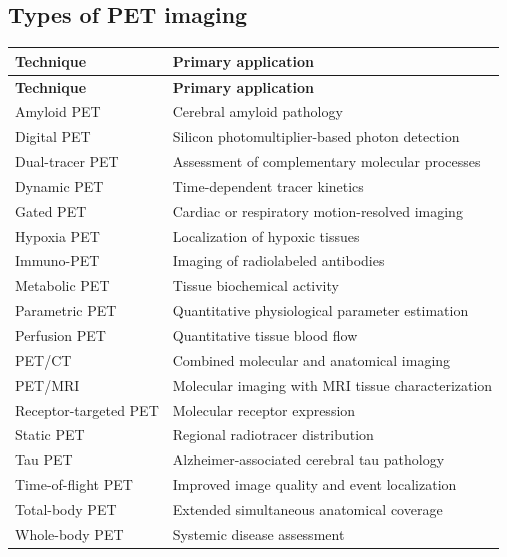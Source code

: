 \subsection{Types of PET imaging}
\begin{longtable}{@{}p{}p{}@{}}
\toprule
\textbf{Technique} & \textbf{Primary application} \\
\midrule
\endfirsthead
\toprule
\textbf{Technique} & \textbf{Primary application} \\
\midrule
\endhead
Amyloid PET & Cerebral amyloid pathology \\
Digital PET & Silicon photomultiplier-based photon detection \\
Dual-tracer PET & Assessment of complementary molecular processes \\
Dynamic PET & Time-dependent tracer kinetics \\
Gated PET & Cardiac or respiratory motion-resolved imaging \\
Hypoxia PET & Localization of hypoxic tissues \\
Immuno-PET & Imaging of radiolabeled antibodies \\
Metabolic PET & Tissue biochemical activity \\
Parametric PET & Quantitative physiological parameter estimation \\
Perfusion PET & Quantitative tissue blood flow \\
PET/CT & Combined molecular and anatomical imaging \\
PET/MRI & Molecular imaging with MRI tissue characterization \\
Receptor-targeted PET & Molecular receptor expression \\
Static PET & Regional radiotracer distribution \\
Tau PET & Alzheimer-associated cerebral tau pathology \\
Time-of-flight PET & Improved image quality and event localization \\
Total-body PET & Extended simultaneous anatomical coverage \\
Whole-body PET & Systemic disease assessment \\
\bottomrule
\end{longtable}

